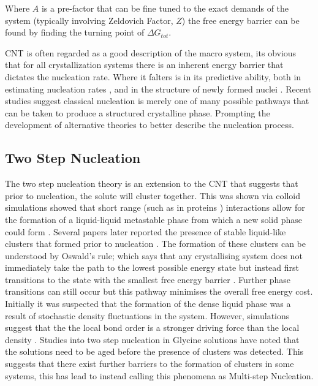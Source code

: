 Where $A$ is a pre-factor that can be fine tuned to the exact demands
of the system (typically involving Zeldovich Factor, $Z$) the free 
energy barrier can be found by finding the turning point of $\Delta G_{tot}$. 

CNT is often regarded as a good description of the macro system, its obvious
that for all crystallization systems there is an inherent energy barrier that 
dictates the nucleation rate. Where it falters is in its predictive ability, 
both in estimating nucleation rates \cite{Gharibeh2005, Vekilov2010}, and in 
the structure of newly formed nuclei \cite{Lee1999, Yau2001}. Recent studies 
suggest classical nucleation is merely one of many possible pathways that can 
be taken to produce a structured crystalline phase. Prompting the development of alternative theories to better describe the nucleation process.

\subsection{Two Step Nucleation}
The two step nucleation theory is an extension to the CNT that suggests 
that prior to nucleation, the solute will cluster together. This was 
shown via colloid simulations showed that short range (such as in proteins \cite{Wolde1997, Gliko2005}) interactions allow for the formation of a liquid-liquid metastable phase from which a new solid phase could form \cite{Anderson2002, Karthika2016}. Several papers later reported the 
presence of stable liquid-like clusters that formed prior to nucleation \cite{Savage2009, Wolde1997, Soga1999}. The formation of these clusters 
can be understood by Oswald's rule; which says that any crystallising 
system does not immediately take the path to the lowest possible energy 
state but instead first transitions to the state with the smallest free 
energy barrier \cite{Ostwald1897}. Further phase transitions can still 
occur but this pathway minimises the overall free energy cost. Initially 
it was suspected that the formation of the dense liquid phase was a 
result of stochastic density fluctuations in the system. However, 
simulations suggest that the the local bond order is a stronger driving 
force than the local density \cite{Tan2013}. Studies into two step 
nucleation in Glycine solutions have noted that the solutions need to be 
aged before the presence of clusters was detected. This suggests that 
there exist further barriers to the formation of clusters in some systems,
this has lead to instead calling this phenomena as Multi-step Nucleation.

